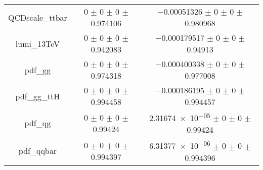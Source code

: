 \begin{table}
\begin{tabular}{ccc}
QCDscale\_ttbar & \num{0} $\pm$ \num{0} $\pm$ \num{0} $\pm$ \num{0.974106} & \num{-0.00051326} $\pm$ \num{0} $\pm$ \num{0} $\pm$ \num{0.980968}\\
lumi\_13TeV & \num{0} $\pm$ \num{0} $\pm$ \num{0} $\pm$ \num{0.942083} & \num{-0.000179517} $\pm$ \num{0} $\pm$ \num{0} $\pm$ \num{0.94913}\\
pdf\_gg & \num{0} $\pm$ \num{0} $\pm$ \num{0} $\pm$ \num{0.974318} & \num{-0.000400338} $\pm$ \num{0} $\pm$ \num{0} $\pm$ \num{0.977008}\\
pdf\_gg\_ttH & \num{0} $\pm$ \num{0} $\pm$ \num{0} $\pm$ \num{0.994458} & \num{-0.000186195} $\pm$ \num{0} $\pm$ \num{0} $\pm$ \num{0.994457}\\
pdf\_qg & \num{0} $\pm$ \num{0} $\pm$ \num{0} $\pm$ \num{0.99424} & \num{2.31674e-05} $\pm$ \num{0} $\pm$ \num{0} $\pm$ \num{0.99424}\\
pdf\_qqbar & \num{0} $\pm$ \num{0} $\pm$ \num{0} $\pm$ \num{0.994397} & \num{6.31377e-06} $\pm$ \num{0} $\pm$ \num{0} $\pm$ \num{0.994396}\\
\bottomrule
\end{tabular}
\end{table}
